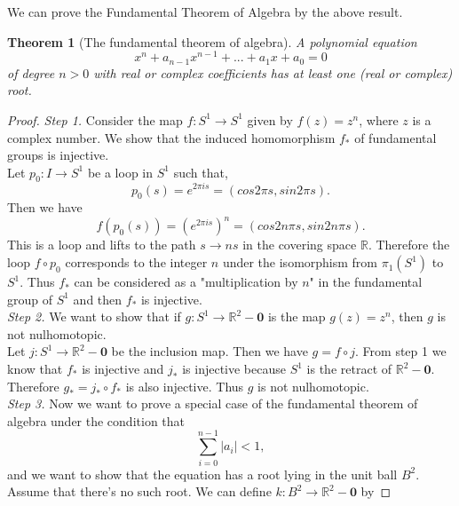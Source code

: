 \documentclass[psamsfonts]{amsart}
\newtheorem{thm}{Theorem}[section]
\theoremstyle{definition}
\theoremstyle{remark}
\numberwithin{equation}{section}
\begin{document}
	We can prove the Fundamental Theorem of Algebra by the above result.
	
	\begin{thm}[The fundamental theorem of algebra]
		A polynomial equation
		\begin{equation}
			x^n + a_{n-1}x^{n-1}+...+a_1x+a_0=0
		\end{equation}
		of degree $n>0$ with real or complex coefficients has at least one (real or complex) root.
	\end{thm}
	
	\begin{proof}
		\textit{Step 1.} Consider the map $f:S^1 \to S^1$ given by $f(z)=z^n$, where $z$ is a complex number. We show that the induced homomorphism $f_*$ of fundamental groups is injective.\\
		Let $p_0:I \to S^1$ be a loop in $S^1$ such that,
		\begin{equation}
			p_0(s) = e^{2\pi is} = (cos2\pi s,sin2\pi s).
		\end{equation}
		Then we have
		\begin{equation}
			f(p_0(s)) = (e^{2\pi is})^n = (cos2n\pi s,sin2n\pi s).
		\end{equation}
		This is a loop and lifts to the path $s\to ns$ in the covering space $\mathbb{R}$. Therefore the loop $f \circ p_0$ corresponds to the integer $n$ under the isomorphism from $\pi_1(S^1)$ to $S^1$. Thus $f_*$ can be considered as a "multiplication by $n$" in the fundamental group of $S^1$ and then $f_*$ is injective.\\
		\textit{Step 2.} We want to show that if $g: S^1 \to \mathbb{R}^2 - \textbf{0}$ is the map $g(z) = z^n$, then $g$ is not nulhomotopic.\\
		Let $j:S^1 \to \mathbb{R}^2-\textbf{0}$ be the inclusion map. Then we have $g = f \circ j$. From step 1 we know that $f_*$ is injective and $j_*$ is injective because $S^1$ is the retract of $\mathbb{R}^2-\textbf{0}$. Therefore $g_*=j_* \circ f_*$ is also injective. Thus $g$ is not nulhomotopic.\\
		\textit{Step 3.} Now we want to prove a special case of the fundamental theorem of algebra under the condition that 
		\begin{equation}
			\sum_{i=0}^{n-1} |a_i| < 1,
		\end{equation}
		and we want to show that the equation has a root lying in the unit ball $B^2$.\\
		Assume that there's no such root. We can define $k:B^2 \to \mathbb{R}^2-\textbf{0}$ by

\end{proof}
\end{document}
